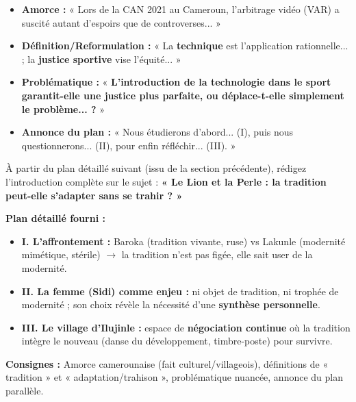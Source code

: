 \documentclass[11pt]{article}
\begin{document}
\begin{corrige}[Exercice 1]
\begin{itemize}
    \item \textcolor{popblue}{\textbf{Amorce :}} « Lors de la CAN 2021 au Cameroun, l'arbitrage vidéo (VAR) a suscité autant d'espoirs que de controverses... »
    \item \textcolor{poppurple}{\textbf{Définition/Reformulation :}} « La \textbf{technique} est l'application rationnelle... ; la \textbf{justice sportive} vise l'équité... »
    \item \textcolor{poporange}{\textbf{Problématique :}} « \textbf{L'introduction de la technologie dans le sport garantit-elle une justice plus parfaite, ou déplace-t-elle simplement le problème... ?} »
    \item \textcolor{popgreen}{\textbf{Annonce du plan :}} « Nous étudierons d'abord... (I), puis nous questionnerons... (II), pour enfin réfléchir... (III). »
\end{itemize}
\end{corrige}

\begin{exercice}
À partir du plan détaillé suivant (issu de la section précédente), rédigez l'introduction complète sur le sujet : \textbf{« Le Lion et la Perle : la tradition peut-elle s'adapter sans se trahir ? »}

\textbf{Plan détaillé fourni :}
\begin{itemize}
    \item \textbf{I. L'affrontement :} Baroka (tradition vivante, ruse) vs Lakunle (modernité mimétique, stérile) $\rightarrow$ la tradition n'est pas figée, elle sait user de la modernité.
    \item \textbf{II. La femme (Sidi) comme enjeu :} ni objet de tradition, ni trophée de modernité ; son choix révèle la nécessité d'une \textbf{synthèse personnelle}.
    \item \textbf{III. Le village d'Ilujinle :} espace de \textbf{négociation continue} où la tradition intègre le nouveau (danse du développement, timbre-poste) pour survivre.
\end{itemize}

\textbf{Consignes :} Amorce camerounaise (fait culturel/villageois), définitions de « tradition » et « adaptation/trahison », problématique nuancée, annonce du plan parallèle.
\end{exercice}
\end{document}
